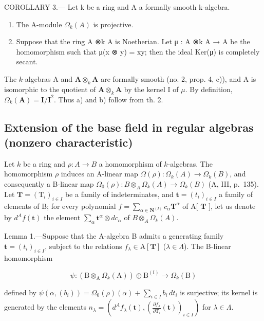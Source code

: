 COROLLARY 3.--- Let k be a ring and A a formally smooth k-algebra.

\begin{enumerate}
\def\labelenumi{\alph{enumi})}
\item
  The A-module \(\Omega_k(A)\) is projective.
\item
  Suppose that the ring A ⊗k A is Noetherian. Let μ : A ⊗k A → A be the homomorphism such that μ(x ⊗ y) = xy; then the ideal Ker(μ) is completely secant.
\end{enumerate}

The \(k\)-algebras A and \(\mathbf{A} \otimes_{k} \mathbf{A}\) are formally smooth (no. 2, prop. 4, c)), and A is isomorphic to the quotient of \(\mathbf{A} \otimes_{k} \mathbf{A}\) by the kernel I of \(\mu\). By definition, \(\Omega_{k}(\mathbf{A}) = \mathbf{I}/\mathbf{I}^{2}\). Thus a) and b) follow from th. 2.

\subsection{Extension of the base field in regular algebras (nonzero characteristic)}

Let \(k\) be a ring and \(\rho: A \to B\) a homomorphism of \(k\)-algebras. The homomorphism \(\rho\) induces an A-linear map \(\Omega(\rho): \Omega_k(A) \to \Omega_k(B)\), and consequently a B-linear map \(\Omega_0(\rho): B \otimes_A \Omega_k(A) \to \Omega_k(B)\) (A, III, p.~135). Let \(\mathbf{T} = (\mathrm{T}_i)_{i \in I}\) be a family of indeterminates, and \(\mathbf{t} = (t_i)_{i \in I}\) a family of elements of B; for every polynomial \(f = \sum_{\alpha \in \mathbf{N}^{(I)}} c_\alpha \mathbf{T}^\alpha\) of A{[} \(\mathbf{T}\) {]}, let us denote by \(d^{A} f(\mathbf{t})\) the element \(\sum_{\alpha} \mathbf{t}^\alpha \otimes dc_\alpha\) of \(B \otimes_A \Omega_k(A)\).

Lemma 1.—Suppose that the A-algebra B admits a generating family \(\mathbf{t} = (t_i)_{i\in I}\), subject to the relations \(f_\lambda \in \mathrm{A}[\mathbf{T}]\) (\(\lambda \in \Lambda\)). The B-linear homomorphism

\[
\psi : (\mathrm{B} \otimes_ {\mathrm{A}} \Omega_ {k} (\mathrm{A})) \oplus \mathrm{B} ^ {(\mathrm{I})} \longrightarrow \Omega_ {k} (\mathrm{B})
\]

defined by \(\psi(\alpha,(b_i)) = \Omega_0(\rho)(\alpha) + \sum_{i\in I}b_i\,dt_i\) is surjective; its kernel is generated by the elements \(n_{\lambda} = \left(d^{A}f_{\lambda}(\mathbf{t}),\left(\frac{\partial f_{\lambda}}{\partial\mathrm{T}_{i}}(\mathbf{t})\right)_{i\in I}\right)\) for \(\lambda \in \Lambda\).

